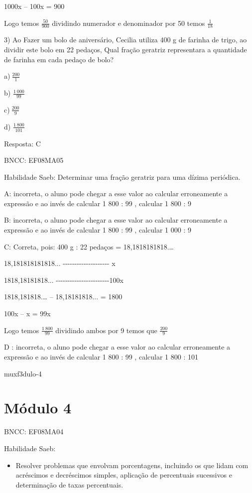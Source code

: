{1000x -- 100x = 900

Logo temos \(\frac{50}{900}\) dividindo numerador e denominador por 50
temos \(\frac{1}{18}\)

3) Ao Fazer um bolo de aniversário, Cecilia utiliza 400 g de farinha de
trigo, ao dividir este bolo em 22 pedaços, Qual fração geratriz
representara a quantidade de farinha em cada pedaço de bolo?

a)\(\ \frac{200}{1}\)

b) \(\frac{1\ 000}{99}\)

c)\(\ \frac{200}{9}\)

d) \(\frac{1\ 800}{101}\)

Resposta: C

BNCC: EF08MA05

Habilidade Saeb: Determinar uma fração geratriz para uma dízima
periódica.

A: incorreta, o aluno pode chegar a esse valor ao calcular erroneamente
a expressão e ao invés de calcular 1 800 : 99 , calcular 1 800 : 9

B: incorreta, o aluno pode chegar a esse valor ao calcular erroneamente
a expressão e ao invés de calcular 1 800 : 99 , calcular 1 000 : 9

C: Correta, pois: 400 g : 22 pedaços = 18,1818181818.\ldots{}

18,181818181818...
-\/-\/-\/-\/-\/-\/-\/-\/-\/-\/-\/-\/-\/-\/-\/-\/-\/-\/-\/- x

1818,18181818...
-\/-\/-\/-\/-\/-\/-\/-\/-\/-\/-\/-\/-\/-\/-\/-\/-\/-\/-\/-\/-\/-\/-100x

1818,181818.\ldots{} -- 18,18181818... = 1800

100x -- x = 99x

Logo temos \(\frac{1\ 800}{99}\) dividindo ambos por 9 temos que
\(\frac{200}{9}\)

D : incorreta, o aluno pode chegar a esse valor ao calcular erroneamente
a expressão e ao invés de calcular 1 800 : 99 , calcular 1 800 : 101

muxf3dulo-4}{%
\section{Módulo 4}

BNCC: EF08MA04

Habilidade Saeb:

\begin{itemize}
\tightlist
\item
  Resolver problemas que envolvam porcentagens, incluindo os que lidam
  com acréscimos e decréscimos simples, aplicação de percentuais
  sucessivos e determinação de taxas percentuais.
\end{itemize}

}
